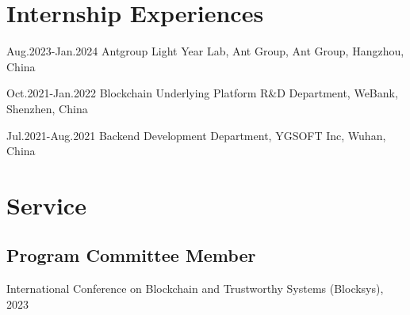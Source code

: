 \documentclass[12pt,letterpaper]{report}
\newcommand{\listitemspace}{0.25em}
\renewenvironment{itemize}
{\begin{list}{}{\setlength{\leftmargin}{0em}
                \setlength{\parskip}{0em}
                \setlength{\itemsep}{\listitemspace}
                \setlength{\parsep}{\listitemspace}}}
{\end{list}}
\begin{document}
    \section*{Internship Experiences}
    \begin{tablist}
        \item[Aug.2023-Jan.2024] \tab{}Antgroup Light Year Lab, Ant Group, Ant Group, Hangzhou, China
        \item[Oct.2021-Jan.2022] \tab{}Blockchain Underlying Platform R\&D Department, WeBank, Shenzhen, China
        \item[Jul.2021-Aug.2021] \tab{}Backend Development Department, YGSOFT Inc, Wuhan, China
    \end{tablist}


    \section*{Service}
    \subsection*{Program Committee Member}
    \begin{itemize}
        \item International Conference on Blockchain and Trustworthy Systems (Blocksys), 2023
    \end{itemize}
\end{document}
